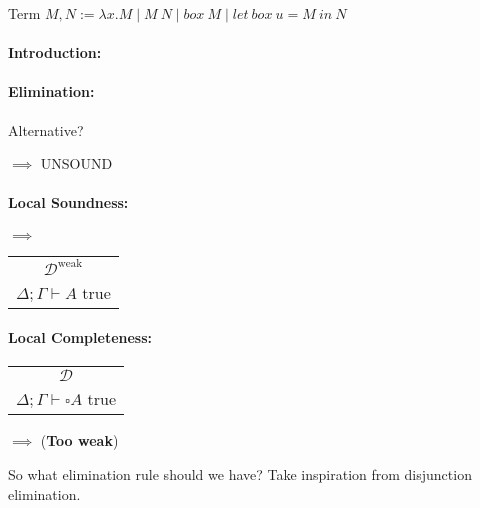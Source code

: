 \documentclass[12 pt]{article}
\begin{document}
       Term $M, N := \lambda x.M \mid M\ N \mid box\ M \mid let\ box\
       u = M\ in\ N$
       
       \paragraph{Introduction:}
       \begin{prooftree}
       \end{prooftree}
       \paragraph{Elimination:}
       \begin{prooftree}
       \end{prooftree}
       Alternative?
       \begin{center}
         \DP
         $\implies$ UNSOUND
       \end{center}
       \paragraph{Local Soundness:}
       \begin{center}
         \noLine
         \DP
         $\implies$
         \begin{tabular}{c}
           $\mathcal{D}^{\text{weak}}$
           \\ $\Delta; \Gamma \vdash A$ true
         \end{tabular}
       \end{center}
       \paragraph{Local Completeness:}
       \begin{center}
         \begin{tabular}{c}
           $\mathcal{D}$
           \\$\Delta; \Gamma \vdash \square A$ true
         \end{tabular}
         $\implies$
         \noLine
         \noLine
         \UIC{$\vdots$}
         \noLine
         \DP
         (\textbf{Too weak})
       \end{center}
       So what elimination rule should we have? Take inspiration from
       disjunction elimination.
       \begin{prooftree}
       \end{prooftree}
\end{document}
